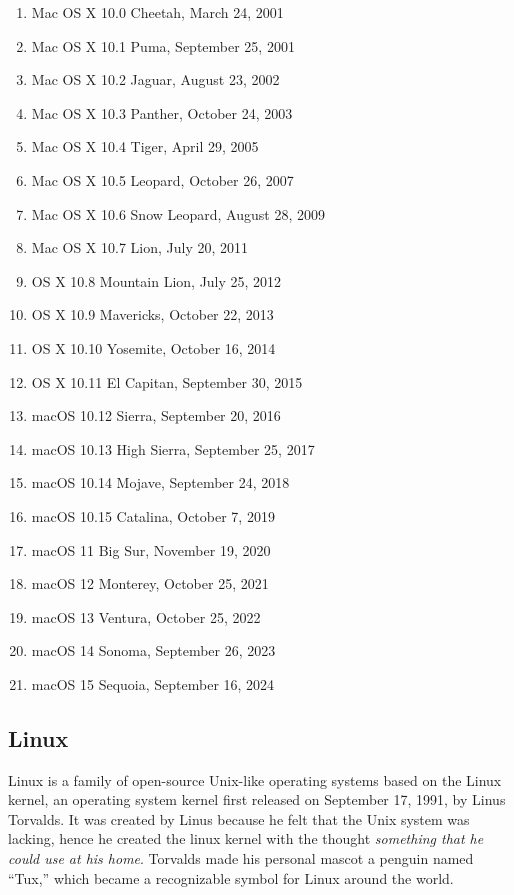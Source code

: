 \begin{enumerate}
    \item Mac OS X 10.0 Cheetah, March 24, 2001
    \item Mac OS X 10.1 Puma, September 25, 2001
    \item Mac OS X 10.2 Jaguar, August 23, 2002
    \item Mac OS X 10.3 Panther, October 24, 2003
    \item Mac OS X 10.4 Tiger, April 29, 2005
    \item Mac OS X 10.5 Leopard, October 26, 2007
    \item Mac OS X 10.6 Snow Leopard, August 28, 2009
    \item Mac OS X 10.7 Lion, July 20, 2011
    \item OS X 10.8 Mountain Lion, July 25, 2012
    \item OS X 10.9 Mavericks, October 22, 2013
    \item OS X 10.10 Yosemite, October 16, 2014
    \item OS X 10.11 El Capitan, September 30, 2015
    \item macOS 10.12 Sierra, September 20, 2016
    \item macOS 10.13 High Sierra, September 25, 2017
    \item macOS 10.14 Mojave, September 24, 2018
    \item macOS 10.15 Catalina, October 7, 2019
    \item macOS 11 Big Sur, November 19, 2020
    \item macOS 12 Monterey, October 25, 2021
    \item macOS 13 Ventura, October 25, 2022
    \item macOS 14 Sonoma, September 26, 2023
    \item macOS 15 Sequoia, September 16, 2024
\end{enumerate}

\newpage
\subsection{Linux}

Linux is a family of open-source Unix-like operating systems based on the Linux kernel, an operating system kernel first released on September 17, 1991, by Linus Torvalds. It was created by Linus because he felt that the Unix system was lacking, hence he created the linux kernel with the thought \emph{something that he could use at his home}. Torvalds made his personal mascot a penguin named “Tux,” which became a recognizable symbol for Linux around the world. \cite{wikipediaLinuxWikipedia, mitLinusTorvalds}

